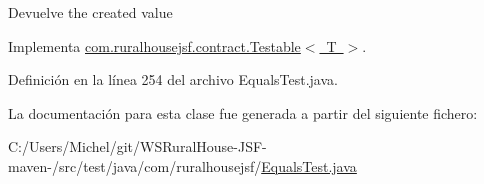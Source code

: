 \begin{DoxyReturn}{Devuelve}
the created value 
\end{DoxyReturn}


Implementa \mbox{\hyperlink{interfacecom_1_1ruralhousejsf_1_1contract_1_1_testable_ae4546a381488faaba1ef7c0f8688de9c}{com.\+ruralhousejsf.\+contract.\+Testable$<$ T $>$}}.



Definición en la línea 254 del archivo Equals\+Test.\+java.



La documentación para esta clase fue generada a partir del siguiente fichero\+:\begin{DoxyCompactItemize}
\item 
C\+:/\+Users/\+Michel/git/\+W\+S\+Rural\+House-\/\+J\+S\+F-\/maven-\//src/test/java/com/ruralhousejsf/\mbox{\hyperlink{_equals_test_8java}{Equals\+Test.\+java}}\end{DoxyCompactItemize}
